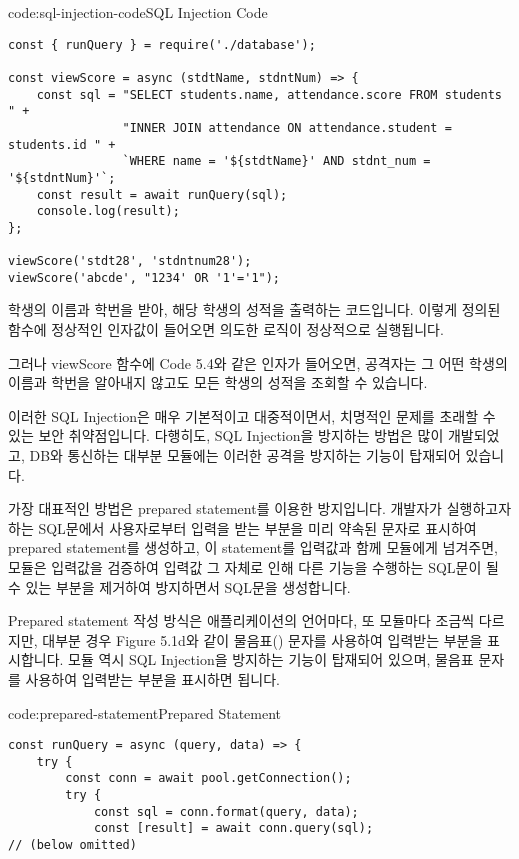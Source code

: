 \begin{codeenv}{code:sql-injection-code}{SQL Injection Code}\begin{verbatim}
const { runQuery } = require('./database');

const viewScore = async (stdtName, stdntNum) => {
    const sql = "SELECT students.name, attendance.score FROM students " +
                "INNER JOIN attendance ON attendance.student = students.id " +
                `WHERE name = '${stdtName}' AND stdnt_num = '${stdntNum}'`;
    const result = await runQuery(sql);
    console.log(result);
};

viewScore('stdt28', 'stdntnum28');
viewScore('abcde', "1234' OR '1'='1");
\end{verbatim}
\end{codeenv}

\는 학생의 이름과 학번을 받아, 해당 학생의 성적을 출력하는 코드입니다. 이렇게 정의된  함수에 정상적인 인자값이 들어오면 의도한 로직이 정상적으로 실행됩니다.

그러나 viewScore 함수에 Code 5.4와 같은 인자가 들어오면, 공격자는 그 어떤 학생의 이름과 학번을 알아내지 않고도 모든 학생의 성적을 조회할 수 있습니다.

이러한 SQL Injection은 매우 기본적이고 대중적이면서, 치명적인 문제를 초래할 수 있는 보안 취약점입니다. 다행히도, SQL Injection을 방지하는 방법은 많이 개발되었고, DB와 통신하는 대부분 모듈에는 이러한 공격을 방지하는 기능이 탑재되어 있습니다.

가장 대표적인 방법은 prepared statement를 이용한 방지입니다. 개발자가 실행하고자 하는 SQL문에서 사용자로부터 입력을 받는 부분을 미리 약속된 문자로 표시하여 prepared statement를 생성하고, 이 statement를 입력값과 함께 모듈에게 넘겨주면, 모듈은 입력값을 검증하여 입력값 그 자체로 인해 다른 기능을 수행하는 SQL문이 될 수 있는 부분을 제거하여 방지하면서 SQL문을 생성합니다.

Prepared statement 작성 방식은 애플리케이션의 언어마다, 또 모듈마다 조금씩 다르지만, 대부분 경우 Figure 5.1d와 같이 물음표() 문자를 사용하여 입력받는 부분을 표시합니다.  모듈 역시 SQL Injection을 방지하는 기능이 탑재되어 있으며, 물음표 문자를 사용하여 입력받는 부분을 표시하면 됩니다.

\begin{codeenv}{code:prepared-statement}{Prepared Statement}\begin{verbatim}
const runQuery = async (query, data) => {
    try {
        const conn = await pool.getConnection();
        try {
            const sql = conn.format(query, data);
            const [result] = await conn.query(sql);
// (below omitted)
\end{verbatim}
\end{codeenv}

